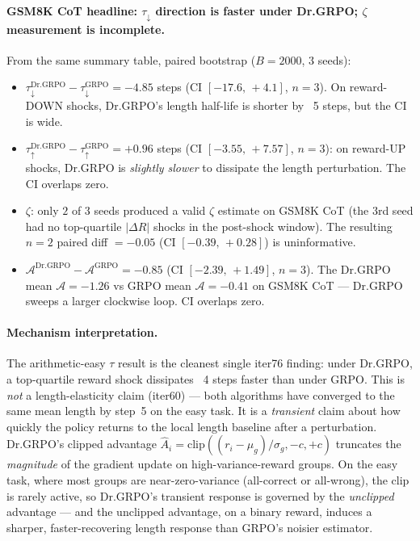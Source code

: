 \paragraph{GSM8K CoT headline: $\tau_{\downarrow}$ direction is faster under Dr.GRPO; $\zeta$ measurement
is incomplete.}
From the same summary table, paired bootstrap ($B = 2000$, $3$ seeds):
\begin{itemize}
\item $\tau^{\mathrm{Dr.GRPO}}_{\downarrow} - \tau^{\mathrm{GRPO}}_{\downarrow}
      = -4.85$ steps (CI $[-17.6,\,+4.1]$, $n = 3$). On reward-DOWN
      shocks, Dr.GRPO's length half-life is shorter by ~5 steps, but
      the CI is wide.
\item $\tau^{\mathrm{Dr.GRPO}}_{\uparrow} - \tau^{\mathrm{GRPO}}_{\uparrow}
      = +0.96$ steps (CI $[-3.55,\,+7.57]$, $n = 3$): on reward-UP
      shocks, Dr.GRPO is \emph{slightly slower} to dissipate the length
      perturbation. The CI overlaps zero.
\item $\zeta$: only $2$ of $3$ seeds produced a valid $\zeta$ estimate
      on GSM8K CoT (the 3rd seed had no top-quartile $|\Delta R|$
      shocks in the post-shock window). The resulting $n = 2$
      paired diff $= -0.05$ (CI $[-0.39,\,+0.28]$) is uninformative.
\item $\mathcal{A}^{\mathrm{Dr.GRPO}} - \mathcal{A}^{\mathrm{GRPO}}
      = -0.85$ (CI $[-2.39,\,+1.49]$, $n = 3$). The Dr.GRPO mean
      $\mathcal{A} = -1.26$ vs GRPO mean $\mathcal{A} = -0.41$ on
      GSM8K CoT --- Dr.GRPO sweeps a larger clockwise loop. CI overlaps
      zero.
\end{itemize}

\paragraph{Mechanism interpretation.}
The arithmetic-easy $\tau$ result is the cleanest single iter76
finding: under Dr.GRPO, a top-quartile reward shock dissipates ~4
steps faster than under GRPO. This is \emph{not} a length-elasticity
claim (iter60) --- both algorithms have converged to the same mean
length by step~5 on the easy task. It is a \emph{transient} claim
about how quickly the policy returns to the local length baseline
after a perturbation. Dr.GRPO's clipped advantage
$\hat A_i = \mathrm{clip}((r_i - \mu_g)/\sigma_g, -c, +c)$ truncates
the \emph{magnitude} of the gradient update on
high-variance-reward groups. On the easy task, where most groups are
near-zero-variance (all-correct or all-wrong), the clip is rarely
active, so Dr.GRPO's transient response is governed by the
\emph{unclipped} advantage --- and the unclipped advantage, on a binary
reward, induces a sharper, faster-recovering length response than
GRPO's noisier estimator.

